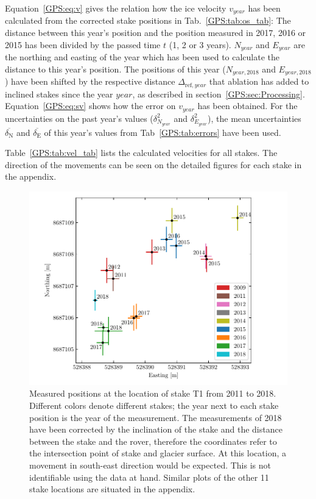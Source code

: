 Equation~\ref{GPS:eq:v} gives the relation how the ice velocity $v_{year}$ has been calculated from the corrected stake positions in
Tab.~\ref{GPS:tab:os_tab}:
The distance between this year's position and the position measured in 2017, 2016 or 2015 has been divided
by the passed time $t$ (1, 2 or 3 years).
$N_{year}$ and $E_{year}$ are the northing and easting of the year which has been used to calculate the distance to
this year's position.
The positions of this year ($N_{year, 2018}$ and $E_{year, 2018}$) have been shifted by the respective distance
$\Delta_{\text{ref}, year}$ that ablation has
added to inclined stakes since the year $year$, as described in section~\ref{GPS:sec:Processing}.
Equation~\ref{GPS:eq:sv} shows how the error on $v_{year}$ has been obtained.
For the uncertainties on the past year's values ($\delta_{N_{year}}^2$ and $\delta_{E_{year}}^2$),
the mean uncertainties $\overline{\delta_{\text{N}}}$ and $\overline{\delta_{\text{E}}}$ of this year's values
from Tab~\ref{GPS:tab:errors} have been used.

Table~\ref{GPS:tab:vel_tab} lists the calculated velocities for all stakes.
The direction of the movements can be seen on the detailed figures for each stake in the appendix.


\begin{figure}[htb]
    \centering
    \includegraphics[width=\textwidth]{./figs/T1_2d.pdf}
    \caption{Measured positions at the location of stake T1 from 2011 to 2018.
    Different colors denote different stakes;
  	the year next to each stake position is the year of the measurement.
  	The measurements of 2018 have been corrected by the inclination of the stake and
  	the distance between the stake and the rover, therefore the coordinates refer to the intersection point
  	of stake and glacier surface.
    	At this location, a movement in south-east direction would be expected.
    	This is not identifiable using the data at hand.
 	Similar plots of the other 11 stake locations are situated in the appendix.}
    \label{GPS:fig:T1_2d}
\end{figure}



